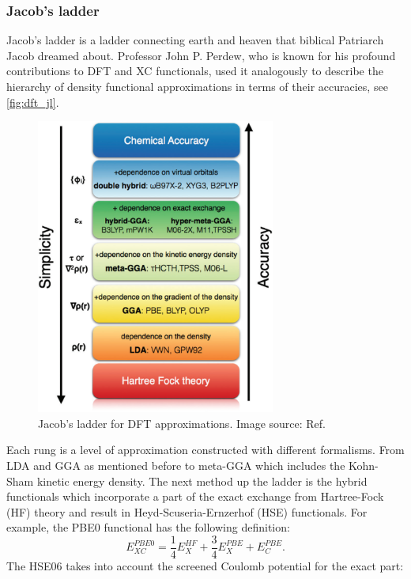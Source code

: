 \subsubsection{Jacob's ladder}
Jacob's ladder is a ladder connecting earth and heaven that biblical Patriarch Jacob dreamed about. Professor John P. Perdew, who is known for his profound contributions to DFT and XC functionals, used it analogously to describe the hierarchy of density functional approximations in terms of their accuracies\cite{van2001density}, see \autoref{fig:dft_jl}.  
\begin{figure}[htb] 
\centering  
\includegraphics[width=0.7\textwidth]{jacobs.png}
\caption[Jacob's ladder for DFT approximations]{ Jacob's ladder for DFT approximations. Image source: Ref. \cite{Peng2016}}  
\label{fig:dft_jl}
\end{figure} 
Each rung is a level of approximation constructed with different formalisms. From LDA and GGA as mentioned before to meta-GGA which includes the Kohn-Sham kinetic energy density. The next method up the ladder is the hybrid functionals which incorporate a part of the exact exchange from Hartree-Fock (HF) theory and result in Heyd-Scuseria-Ernzerhof (HSE) functionals. For example, the PBE0 functional\cite{Carlo1999} has the following definition:
\begin{equation}
E_{XC}^{PBE0}=\frac{1}{4}E_X^{HF}+\frac{3}{4}E_X^{PBE}+E_C^{PBE}.
\end{equation}
The HSE06\cite{Jochen2003} takes into account the screened Coulomb potential for the exact part:

